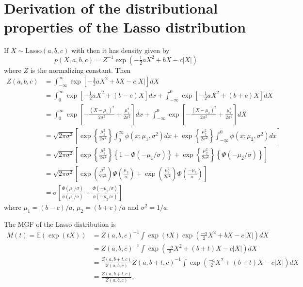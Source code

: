 \documentclass[11pt]{article}
\begin{document}
\section{Derivation of the distributional properties of the Lasso distribution}\label{Suppl:deriv_LassoDist_properties}
If $X \sim \mbox{Lasso}(a,b,c)$ with then it has density given by
$$
p(X,a,b,c) = Z^{-1}\exp\left( -\tfrac{1}{2}aX^2 + bX - c|X| \right)
$$
where $Z$ is the normalizing constant. Then
$$
\begin{array}{rl}
Z(a,b,c)
& = \int_{-\infty}^\infty \exp\left[ -\tfrac{1}{2}aX^2 + bX - c|X| \right] dX
\\ [2ex]
& 
= \int_0^\infty    \exp\left[ -\tfrac{1}{2}aX^2 + (b - c)X \right] dx
+ \int_{-\infty}^0 \exp\left[ -\tfrac{1}{2}aX^2 + (b + c)X \right] dX
\\ [2ex]
&  
= \int_0^\infty \exp\left[ - \frac{(X - \mu_1)^2}{2\sigma^2} + \frac{\mu_1^2}{2\sigma^2} \right] dx
+ \int_{-\infty}^0 \exp\left[ - \frac{(X - \mu_2)^2}{2\sigma^2} + \frac{\mu_2^2}{2\sigma^2} \right] dX
\\ [2ex]
&  
= \sqrt{2\pi\sigma^2}
\left[  \exp\left\{  \frac{\mu_1^2}{2\sigma^2} \right\} \int_0^\infty \phi(x;\mu_1,\sigma^2) dx
+       \exp\left\{  \frac{\mu_2^2}{2\sigma^2} \right\} \int_{-\infty}^0 \phi(x;\mu_2,\sigma^2) dx
\right] 
\\ [2ex]
&  
= \sqrt{2\pi\sigma^2}
\left[  \exp\left\{  \frac{\mu_1^2}{2\sigma^2} \right\} \left\{ 1 - \Phi(-\mu_1/\sigma) \right\} 
+       \exp\left\{  \frac{\mu_2^2}{2\sigma^2} \right\} \left\{\Phi(-\mu_2/\sigma) \right\} 
\right] 
\\ [2ex]
&  
= \sqrt{2\pi\sigma^2}
\left[  \exp\left(  \frac{\mu_1^2}{2\sigma^2} \right) \Phi\left(\frac{\mu_1}{\sigma} \right) 
+       \exp\left(  \frac{\mu_2^2}{2\sigma^2} \right) \Phi\left( \frac{-\mu_2}{\sigma} \right)  
\right] 
\\ [2ex]
& 
= 
  \sigma \left[ \frac{\Phi(\mu_1/\sigma)}{\phi(\mu_1/\sigma)}
+ \frac{\Phi(-\mu_2/\sigma)}{\phi(-\mu_2/\sigma)}  \right] 
\end{array} 
$$
where $\mu_1 = (b-c)/a$, $\mu_2 = (b + c)/a$ and $\sigma^2 = 1/a$.

The MGF of the Lasso distribution is
\begin{align*}
    M(t) = \mathbb{E} (\exp (tX)) & = Z(a,b,c)^{-1} \int \exp (tX) \exp \left(\frac{-a}{2}X^2 + bX -c|X| \right) dX \\ &
    = Z(a,b,c)^{-1} \int \exp \left(\frac{-a}{2}X^2 + (b+t) X -c|X|\right) dX \\ &
    = \frac{Z(a,b+t,c)}{Z(a,b,c)}Z(a,b+t,c)^{-1} \int \exp \left(\frac{-a}{2}X^2 + (b+t) X -c|X|\right) dX  \\ &
    = \frac{Z(a,b+t,c)}{Z(a,b,c)}.
\end{align*}
\end{document}
